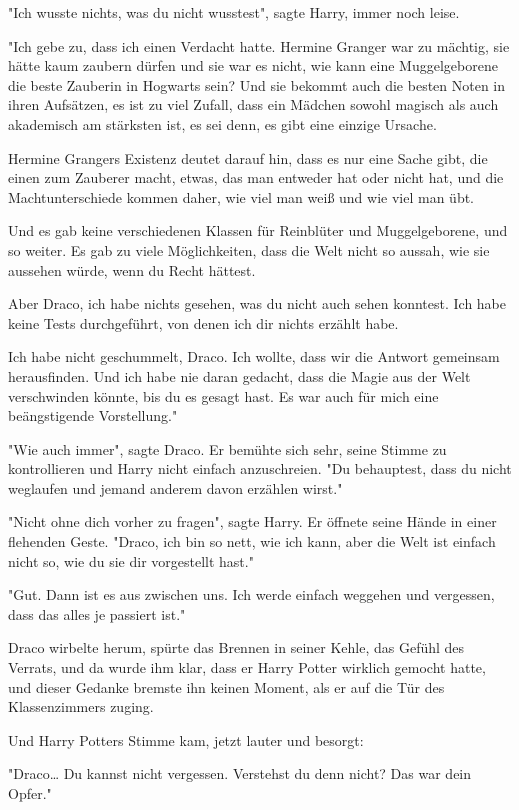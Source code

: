 {"Ich wusste nichts, was du nicht wusstest", sagte Harry, immer noch leise.

"Ich gebe zu, dass ich einen Verdacht hatte. Hermine Granger war zu mächtig, sie hätte kaum zaubern dürfen und sie war es nicht, wie kann eine Muggelgeborene die beste Zauberin in Hogwarts sein? Und sie bekommt auch die besten Noten in ihren Aufsätzen, es ist zu viel Zufall, dass ein Mädchen sowohl magisch als auch akademisch am stärksten ist, es sei denn, es gibt eine einzige Ursache.

Hermine Grangers Existenz deutet darauf hin, dass es nur eine Sache gibt, die einen zum Zauberer macht, etwas, das man entweder hat oder nicht hat, und die Machtunterschiede kommen daher, wie viel man weiß und wie viel man übt.

Und es gab keine verschiedenen Klassen für Reinblüter und Muggelgeborene, und so weiter. Es gab zu viele Möglichkeiten, dass die Welt nicht so aussah, wie sie aussehen würde, wenn du Recht hättest.

Aber Draco, ich habe nichts gesehen, was du nicht auch sehen konntest. Ich habe keine Tests durchgeführt, von denen ich dir nichts erzählt habe.

Ich habe nicht geschummelt, Draco. Ich wollte, dass wir die Antwort gemeinsam herausfinden. Und ich habe nie daran gedacht, dass die Magie aus der Welt verschwinden könnte, bis du es gesagt hast. Es war auch für mich eine beängstigende Vorstellung."

"Wie auch immer", sagte Draco. Er bemühte sich sehr, seine Stimme zu kontrollieren und Harry nicht einfach anzuschreien. "Du behauptest, dass du nicht weglaufen und jemand anderem davon erzählen wirst."

"Nicht ohne dich vorher zu fragen", sagte Harry. Er öffnete seine Hände in einer flehenden Geste. "Draco, ich bin so nett, wie ich kann, aber die Welt ist einfach nicht so, wie du sie dir vorgestellt hast."

"Gut. Dann ist es aus zwischen uns. Ich werde einfach weggehen und vergessen, dass das alles je passiert ist."

Draco wirbelte herum, spürte das Brennen in seiner Kehle, das Gefühl des Verrats, und da wurde ihm klar, dass er Harry Potter wirklich gemocht hatte, und dieser Gedanke bremste ihn keinen Moment, als er auf die Tür des Klassenzimmers zuging.

Und Harry Potters Stimme kam, jetzt lauter und besorgt:

"Draco… Du kannst nicht vergessen. Verstehst du denn nicht? Das war dein Opfer."

}
